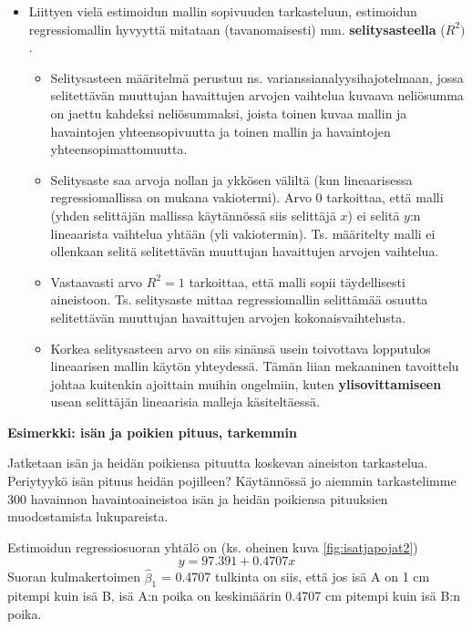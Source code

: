 \documentclass[
]{book}
\providecommand{\tightlist}{%
  \setlength{\itemsep}{0pt}\setlength{\parskip}{0pt}}
\begin{document}
\begin{itemize}
\tightlist
\item
  Liittyen vielä estimoidun mallin sopivuuden tarkasteluun, estimoidun regressiomallin hyvyyttä mitataan (tavanomaisesti) mm. \textbf{selitysasteella} (\(R^2)\).

  \begin{itemize}
  \tightlist
  \item
    Selitysasteen määritelmä perustuu ns. varianssianalyysihajotelmaan, jossa selitettävän muuttujan havaittujen arvojen vaihtelua kuvaava neliösumma on jaettu kahdeksi neliösummaksi, joista toinen kuvaa mallin ja havaintojen yhteensopivuutta ja toinen mallin ja havaintojen yhteensopimattomuutta.
  \item
    Selitysaste saa arvoja nollan ja ykkösen väliltä (kun lineaarisessa regressiomallissa on mukana vakiotermi). Arvo 0 tarkoittaa, että malli (yhden selittäjän mallissa käytännössä siis selittäjä \(x\)) ei selitä \(y\):n lineaarista vaihtelua yhtään (yli vakiotermin). Ts. määritelty malli ei ollenkaan selitä selitettävän muuttujan havaittujen arvojen vaihtelua.
  \item
    Vastaavasti arvo \(R^2 = 1\) tarkoittaa, että malli sopii täydellisesti aineistoon. Ts. selitysaste mittaa regressiomallin selittämää osuutta selitettävän muuttujan havaittujen arvojen kokonaisvaihtelusta.
  \item
    Korkea selitysasteen arvo on siis sinänsä usein toivottava lopputulos lineaarisen mallin käytön yhteydessä. Tämän liian mekaaninen tavoittelu johtaa kuitenkin ajoittain muihin ongelmiin, kuten \textbf{ylisovittamiseen} usean selittäjän lineaarisia malleja käsiteltäessä.
  \end{itemize}
\end{itemize}

\hfill\break

\begin{eblock}{}
\textbf{Esimerkki: isän ja poikien pituus, tarkemmin}

Jatketaan isän ja heidän poikiensa pituutta koskevan aineiston tarkastelua. Periytyykö isän pituus heidän pojilleen? Käytännössä jo aiemmin tarkastelimme 300 havainnon havaintoaineistoa isän ja heidän poikiensa pituuksien muodostamista lukupareista.

Estimoidun regressiosuoran yhtälö on (ks. oheinen kuva \ref{fig:isatjapojat2})
\[
y = 97.391+ 0.4707 x
\]
Suoran kulmakertoimen \(\widehat{\beta}_1\) = 0.4707 tulkinta on siis, että jos isä A on 1 cm pitempi kuin isä B, isä A:n poika on keskimäärin 0.4707 cm pitempi kuin isä B:n poika.

\end{eblock}
\end{document}
